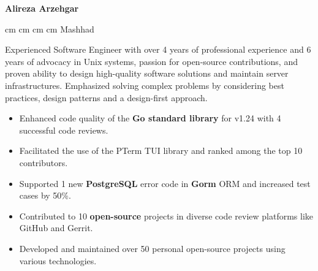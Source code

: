 \documentclass{engineercv}
\begin{document}
\begin{center}
  \textbf{\fontsize{24 pt}{24 pt}\selectfont Alireza Arzehgar}

  \vspace{0.2 cm}

  \scriptsize
  \mbox{}
   cm
  \mbox{}
   cm
  \mbox{}
   cm
  \mbox{}
   cm
  \mbox{{\color{black}\footnotesize\faMapMarker*}\hspace*{0.13cm}Mashhad}
\end{center}


Experienced Software Engineer with over 4 years of professional experience and 6 years of advocacy in Unix systems,
passion for open-source contributions, and proven ability to design high-quality software solutions and
maintain server infrastructures. Emphasized solving complex problems by considering best practices,
design patterns and a design-first approach.

\begin{itemize}
  \item Enhanced code quality of the \textbf{Go standard library} for v1.24 with 4 successful code reviews.
  \item Facilitated the use of the PTerm TUI library and ranked among the top 10 contributors.
  \item Supported 1 new \textbf{PostgreSQL} error code in \textbf{Gorm} ORM and increased test cases by 50\%.
  \item Contributed to 10 \textbf{open-source} projects in diverse code review platforms like GitHub and Gerrit.
  \item Developed and maintained over 50 personal open-source projects using various technologies.
\end{itemize}
\end{document}

